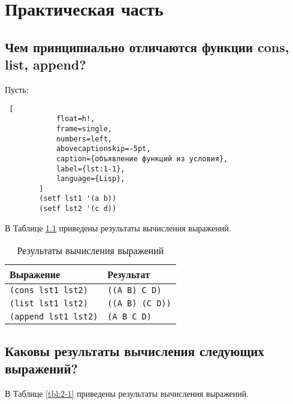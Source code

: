 \chapter{Практическая часть}

    \section{Чем принципиально отличаются функции cons, list, append?}
    
        Пусть:
        \begin{lstlisting} [
            float=h!,
            frame=single,
            numbers=left,
            abovecaptionskip=-5pt,
            caption={объявление функций из условия},
            label={lst:1-1},
            language={Lisp},
        ]
        (setf lst1 '(a b))
        (setf lst2 '(c d))
        \end{lstlisting}
        
        В Таблице \ref{tbl:1-1} приведены результаты вычисления выражений.
        
        \begin{table}[!ht]
            \begin{center}
                \caption{Результаты вычисления выражений}
                \label{tbl:1-1}
                \begin{tabular}{|l|l|}
                    \hline
                    \bfseries Выражение & \bfseries Результат\\\hline
                    \texttt{(cons lst1 lst2)} & \texttt{((A B) C D)}\\\hline
                    \texttt{(list lst1 lst2)} & \texttt{((A B) (C D))}\\\hline
                    \texttt{(append lst1 lst2)} & \texttt{(A B C D)}\\\hline
                \end{tabular}
            \end{center}
        \end{table}
    
    \section{Каковы результаты вычисления следующих выражений?}
    
        В Таблице \ref{tbl:2-1} приведены результаты вычисления выражений.
        
